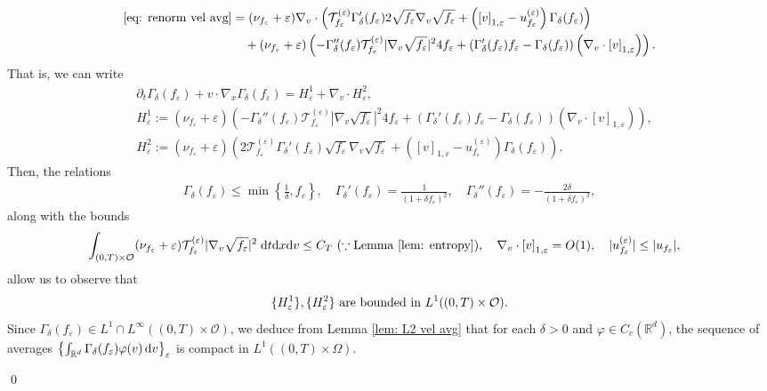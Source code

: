 \documentclass[10pt, reqno]{amsart}
\theoremstyle{plain}
\theoremstyle{definition}
\theoremstyle{remark}
\renewenvironment{proof}[1][\proofname]{\noindent{\scshape #1.\quad}}{\qed}
\numberwithin{equation}{section}
\newcommand{\calO}{\mathcal O}
\newcommand{\calT}{\mathcal T}
\newcommand{\p}{\partial}
\newcommand{\R}{\mathbb{R}}
\newcommand{\ve}{\varepsilon}
\newcommand{\dx}{\textnormal{d}x}
\newcommand{\dv}{\textnormal{d}v}
\newcommand{\dt}{\textnormal{d}t}
\newcommand{\lt}{\left}
\newcommand{\rt}{\right}
\newcommand{\intr}{\int_{\R^d}}
\newcommand{\renorm}[3]{\lt[#1\rt]_{#2 , #3}}
\begin{document}
\begin{proof}
\begin{align*}
    \eqref{eq: renorm vel avg} &= (\nu_{f_\ve} + \ve) \nabla_v\cdot \lt( \calT_{f_\ve}^{(\ve)} \Gamma_\delta'(f_\ve) 2\sqrt{f_\ve} \nabla_v \sqrt{f_\ve} + \lt(\renorm{v}{1}{\ve} - u_{f_\ve}^{(\ve)}\rt) \Gamma_\delta(f_\ve) \rt) \\
    &\quad + (\nu_{f_\ve} + \ve) \lt( -\Gamma_\delta''(f_\ve) \calT_{f_\ve}^{(\ve)} |\nabla_v \sqrt{f_\ve}|^2 4f_\ve + \lt(\Gamma_\delta'(f_\ve) f_\ve - \Gamma_\delta(f_\ve) \rt) \lt(\nabla_v\cdot \renorm{v}{1}{\ve}\rt) \rt).
\end{align*}
That is, we can write
\begin{equation} \label{eq: h1 h2}
    \begin{split}
    &\p_t \Gamma_\delta(f_\ve) + v\cdot \nabla_x \Gamma_\delta(f_\ve) = H_\ve^1 + \nabla_v\cdot H_\ve^2, \\
    &H_{\ve}^1 := (\nu_{f_\ve} + \ve) \lt( -\Gamma_\delta''(f_\ve) \calT_{f_\ve}^{(\ve)} |\nabla_v \sqrt{f_\ve}|^2 4f_\ve + \lt(\Gamma_\delta'(f_\ve) f_\ve - \Gamma_\delta(f_\ve) \rt) \lt(\nabla_v\cdot \renorm{v}{1}{\ve}\rt) \rt), \\
    &H_\ve^2 := (\nu_{f_\ve} + \ve) \lt( 2\calT_{f_\ve}^{(\ve)} \Gamma_\delta'(f_\ve) \sqrt{f_\ve} \nabla_v \sqrt{f_\ve} + \lt(\renorm{v}{1}{\ve} - u_{f_\ve}^{(\ve)}\rt) \Gamma_\delta(f_\ve) \rt).
    \end{split}
\end{equation}
Then, the relations
\begin{align*}
    \Gamma_\delta(f_\ve)\le \min\lt\{\frac{1}{\delta}, f_\ve \rt\}, \quad \Gamma_\delta'(f_\ve) = \frac{1}{(1+\delta f_\ve)^2}, \quad \Gamma_\delta''(f_\ve) = -\frac{2\delta}{(1+\delta f_\ve)^3},
\end{align*}
along with the bounds
\begin{align*}
    &\int_{(0,T)\times \calO} (\nu_{f_\ve} + \ve) \calT_{f_\ve}^{(\ve)} |\nabla_v \sqrt{f_\ve}|^2 \; \dt\dx\dv \le C_T \ (\because \textnormal{Lemma \ref{lem: entropy}}), \quad \nabla_v\cdot \renorm{v}{1}{\ve} = O(1), \quad |u_{f_\ve}^{(\ve)}| \le |u_{f_\ve}|,
\end{align*}
allow us to observe that
\begin{align*}
    \textnormal{$\{H_\ve^1\}, \{H_\ve^2\}$ are bounded in $L^1((0,T)\times \calO)$}.
\end{align*}
Since $\Gamma_\delta(f_\ve) \in L^1\cap L^\infty((0,T)\times \calO)$, we deduce from Lemma \ref{lem: L2 vel avg} that for each $\delta>0$ and $\varphi\in C_c(\R^d)$, the sequence of averages $\lt\{ \intr \Gamma_\delta(f_\ve) \varphi(v)\,\dv\rt\}_\ve$ is compact in $L^1((0,T)\times \Omega)$.


\end{proof}
\end{document}
